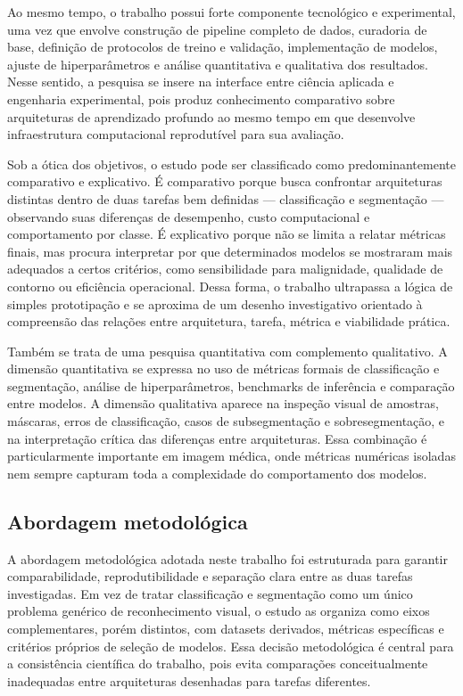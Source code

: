 \documentclass[tcc,capa]{texufpel}
\begin{document}
Ao mesmo tempo, o trabalho possui forte componente tecnológico e experimental, uma vez que envolve construção de pipeline completo de dados, curadoria de base, definição de protocolos de treino e validação, implementação de modelos, ajuste de hiperparâmetros e análise quantitativa e qualitativa dos resultados. Nesse sentido, a pesquisa se insere na interface entre ciência aplicada e engenharia experimental, pois produz conhecimento comparativo sobre arquiteturas de aprendizado profundo ao mesmo tempo em que desenvolve infraestrutura computacional reprodutível para sua avaliação.

Sob a ótica dos objetivos, o estudo pode ser classificado como predominantemente comparativo e explicativo. É comparativo porque busca confrontar arquiteturas distintas dentro de duas tarefas bem definidas --- classificação e segmentação --- observando suas diferenças de desempenho, custo computacional e comportamento por classe. É explicativo porque não se limita a relatar métricas finais, mas procura interpretar por que determinados modelos se mostraram mais adequados a certos critérios, como sensibilidade para malignidade, qualidade de contorno ou eficiência operacional. Dessa forma, o trabalho ultrapassa a lógica de simples prototipação e se aproxima de um desenho investigativo orientado à compreensão das relações entre arquitetura, tarefa, métrica e viabilidade prática.

Também se trata de uma pesquisa quantitativa com complemento qualitativo. A dimensão quantitativa se expressa no uso de métricas formais de classificação e segmentação, análise de hiperparâmetros, benchmarks de inferência e comparação entre modelos. A dimensão qualitativa aparece na inspeção visual de amostras, máscaras, erros de classificação, casos de subsegmentação e sobresegmentação, e na interpretação crítica das diferenças entre arquiteturas. Essa combinação é particularmente importante em imagem médica, onde métricas numéricas isoladas nem sempre capturam toda a complexidade do comportamento dos modelos.

\subsection{Abordagem metodológica}

A abordagem metodológica adotada neste trabalho foi estruturada para garantir comparabilidade, reprodutibilidade e separação clara entre as duas tarefas investigadas. Em vez de tratar classificação e segmentação como um único problema genérico de reconhecimento visual, o estudo as organiza como eixos complementares, porém distintos, com datasets derivados, métricas específicas e critérios próprios de seleção de modelos. Essa decisão metodológica é central para a consistência científica do trabalho, pois evita comparações conceitualmente inadequadas entre arquiteturas desenhadas para tarefas diferentes.
\end{document}
